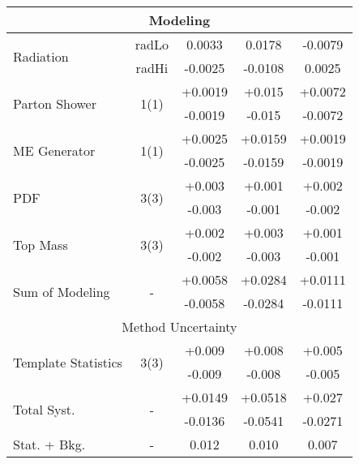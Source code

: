 \begin{table}[h!]
\begin{tabular}{lcccc}
\hline
\multicolumn{5}{c}{Modeling} \\\hline
\multirow{2}{*}{Radiation} & radLo & 0.0033 & 0.0178 & -0.0079\\
                           & radHi & -0.0025 & -0.0108 & 0.0025\\ \hline
\multirow{2}{*}{Parton Shower} & \multirow{2}{*}{1(1)} & +0.0019 & +0.015 & +0.0072\\
                      &                       & -0.0019 & -0.015 & -0.0072\\\hline
\multirow{2}{*}{ME Generator} & \multirow{2}{*}{1(1)} & +0.0025 & +0.0159 & +0.0019\\
                      &                       & -0.0025 & -0.0159 & -0.0019\\\hline
\multirow{2}{*}{PDF} & \multirow{2}{*}{3(3)} & +0.003 & +0.001 & +0.002\\
                      &                       & -0.003 & -0.001 & -0.002\\\hline
\multirow{2}{*}{Top Mass} & \multirow{2}{*}{3(3)} & +0.002 & +0.003 & +0.001\\
                      &                       & -0.002 & -0.003 & -0.001\\\hline

\hline\hline
\multirow{2}{*}{Sum of Modeling} & \multirow{2}{*}{-} & +0.0058 & +0.0284 & +0.0111\\
                      &                       & -0.0058 & -0.0284 & -0.0111\\\hline

\hline
\multicolumn{5}{c}{Method Uncertainty} \\\hline
\multirow{2}{*}{Template Statistics} & \multirow{2}{*}{3(3)} & +0.009 & +0.008 & +0.005\\
                      &                       & -0.009 & -0.008 & -0.005\\\hline

\hline\hline
\multirow{2}{*}{Total Syst.} & \multirow{2}{*}{-} & +0.0149 & +0.0518 & +0.027\\
                      &                       & -0.0136 & -0.0541 & -0.0271\\\hline
Stat. + Bkg. & - & 0.012 & 0.010 & 0.007 \\\hline

\hline\hline
\end{tabular}



\end{table}
